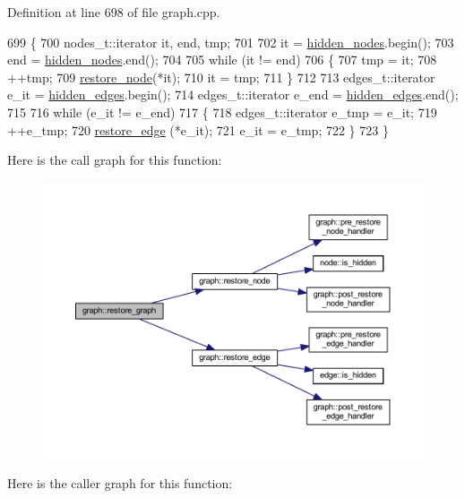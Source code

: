 Definition at line 698 of file graph.\+cpp.


\begin{DoxyCode}
699 \{
700     nodes\_t::iterator it, end, tmp;
701 
702     it = \mbox{\hyperlink{classgraph_a7a3f2842a409a4b35ca8ef34598df9ca}{hidden\_nodes}}.begin();
703     end = \mbox{\hyperlink{classgraph_a7a3f2842a409a4b35ca8ef34598df9ca}{hidden\_nodes}}.end();
704 
705     \textcolor{keywordflow}{while} (it != end)
706     \{
707         tmp = it;
708         ++tmp;
709         \mbox{\hyperlink{classgraph_ab57aab79e649cc275052b7decbdd03ec}{restore\_node}}(*it);
710         it = tmp;
711     \}
712 
713     edges\_t::iterator e\_it = \mbox{\hyperlink{classgraph_a0d3da33d047ba7cdc3dc68b5d9c84b88}{hidden\_edges}}.begin();
714     edges\_t::iterator e\_end = \mbox{\hyperlink{classgraph_a0d3da33d047ba7cdc3dc68b5d9c84b88}{hidden\_edges}}.end();
715 
716     \textcolor{keywordflow}{while} (e\_it != e\_end)
717     \{
718         edges\_t::iterator e\_tmp = e\_it;
719         ++e\_tmp;
720         \mbox{\hyperlink{classgraph_a2e5426682a0897b9f9104b019970bedc}{restore\_edge}} (*e\_it);
721         e\_it = e\_tmp;
722     \}
723 \}
\end{DoxyCode}
Here is the call graph for this function\+:
\nopagebreak
\begin{figure}[H]
\begin{center}
\leavevmode
\includegraphics[width=350pt]{classgraph_a53e2a5505fa6427587e12d66e4a86cec_cgraph}
\end{center}
\end{figure}
Here is the caller graph for this function\+:
\nopagebreak
